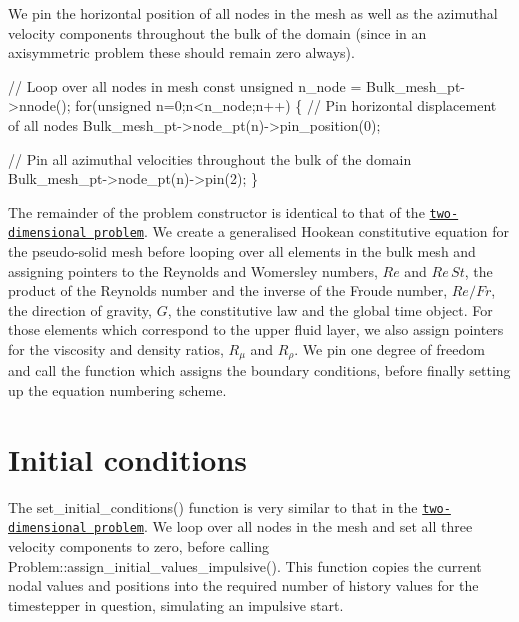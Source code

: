 We pin the horizontal position of all nodes in the mesh as well as the azimuthal velocity components throughout the bulk of the domain (since in an axisymmetric problem these should remain zero always).


\begin{DoxyCodeInclude}
 \textcolor{comment}{// Loop over all nodes in mesh}
 \textcolor{keyword}{const} \textcolor{keywordtype}{unsigned} n\_node = Bulk\_mesh\_pt->nnode();
 \textcolor{keywordflow}{for}(\textcolor{keywordtype}{unsigned} n=0;n<n\_node;n++)
  \{
   \textcolor{comment}{// Pin horizontal displacement of all nodes}
   Bulk\_mesh\_pt->node\_pt(n)->pin\_position(0);

   \textcolor{comment}{// Pin all azimuthal velocities throughout the bulk of the domain}
   Bulk\_mesh\_pt->node\_pt(n)->pin(2);
  \}

\end{DoxyCodeInclude}


The remainder of the problem constructor is identical to that of the \href{../../../navier_stokes/two_layer_interface/html/index.html#constructor}{\tt two-\/dimensional problem}. We create a generalised Hookean constitutive equation for the pseudo-\/solid mesh before looping over all elements in the bulk mesh and assigning pointers to the Reynolds and Womersley numbers, $ Re $ and $ Re\, St $, the product of the Reynolds number and the inverse of the Froude number, $ Re/Fr $, the direction of gravity, $ G $, the constitutive law and the global time object. For those elements which correspond to the upper fluid layer, we also assign pointers for the viscosity and density ratios, $ R_\mu $ and $ R_\rho $. We pin one degree of freedom and call the function which assigns the boundary conditions, before finally setting up the equation numbering scheme.



 

\hypertarget{index_set_initial_condition}{}\section{Initial conditions}\label{index_set_initial_condition}
The {\ttfamily set\+\_\+initial\+\_\+conditions()} function is very similar to that in the \href{../../../navier_stokes/two_layer_interface/html/index.html#set_initial_condition}{\tt two-\/dimensional problem}. We loop over all nodes in the mesh and set all three velocity components to zero, before calling {\ttfamily Problem\+::assign\+\_\+initial\+\_\+values\+\_\+impulsive()}. This function copies the current nodal values and positions into the required number of history values for the timestepper in question, simulating an impulsive start.


